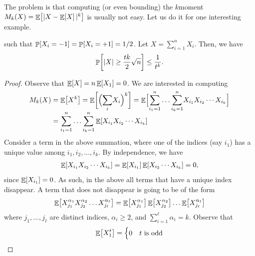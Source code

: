 The problem is that computing (or even bounding) the $k$\th moment
$M_k(X) = \mathop{\mathbb{E}}\!\left[ {|X-\mathop{\mathbb{E}}\!\left[ {X} \right]|^k} \right]$ is usually not easy. Let us do it for one
interesting example.
\begin{lemma}
     such that
    $\Prob{X_i=-1} = \Prob{X_i =+1} = 1/2$. Let
    $X = \sum_{i=1}^n X_i$. Then, we have
    \begin{align*}
      \Prob{\cardin{X} \geq \frac{tk}{2} \sqrt{n}}%
      \leq%
      \frac{1}{t^k}.
    \end{align*}
\end{lemma}
\begin{proof}    
    Observe that $\mathop{\mathbb{E}}\!\left[ {X} \right] = n \mathop{\mathbb{E}}\!\left[ {X_1} \right] = 0$.  We are interested in
    computing
    \begin{align*}
        M_k(X)%
        &=%
        \Ex{  X^{k}}%
        =%
        \Ex{  \Bigl(\smash{\sum_i} X_i \Bigr)^{k}}%
        =%
        \Ex{\Bigl. \smash{\sum_{i_1=1}^n}  \ldots \smash{\sum_{i_k=1}^n}  X_{i_1} X_{i_2} \cdots
           X_{i_k} }%
        \\&
        =%
        \sum_{i_1=1}^n  \ldots \sum_{i_k=1}^n
        \Ex{X_{i_1} X_{i_2} \cdots
           X_{i_k} }%
        \eqlab{m:k}
    \end{align*}
    Consider a term in the above summation, where one of the indices
    (say $i_1$) has a unique value among $i_1, i_2, \ldots, i_k$. By
    independence, we have
    \begin{align*}
      \mathop{\mathbb{E}}\!\left[ {X_{i_1} X_{i_2} \cdots X_{i_k} } \right]
      = 
      \mathop{\mathbb{E}}\!\left[ {X_{i_1}} \right]\mathop{\mathbb{E}}\!\left[ { X_{i_2} \cdots X_{i_k} } \right] = 0,
    \end{align*}
    since $\mathop{\mathbb{E}}\!\left[ {X_{i_1}} \right] = 0$.  As such, in the above all terms that
    have a unique index disappear. A term that does not disappear is
    going to be of the form
    \begin{equation*}
        \Ex{X_{j_1}^{\alpha_1} X_{j_2}^{\alpha_2} \ldots
           X_{j_\ell}^{\alpha_\ell}}
        =%
        \Ex{X_{j_1}^{\alpha_1}}\Ex{ X_{j_2}^{\alpha_2}} \ldots
        \Ex{ X_{j_\ell}^{\alpha_\ell}}
    \end{equation*}
    where $j_1, \ldots, j_\ell$ are distinct indices, $\alpha_i \geq 2$, and $\sum_{i=1}^\ell \alpha_i = k$. Observe that
    \[
        \mathop{\mathbb{E}}\!\left[ {X_1^t} \right] =\begin{cases}
            0 & t \text{ is odd}\\

\end{cases}\]
\end{proof}
